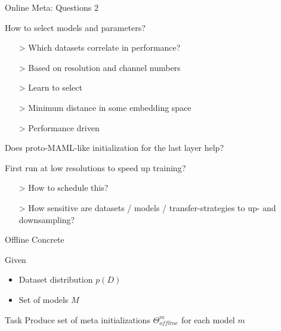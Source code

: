\documentclass[aspectratio=169,12pt,handout]{beamer}
\begin{document}
\begin{frame}{Online Meta: Questions 2}


\begin{itemizebig}
    \item How to select models and parameters?
    \begin{itemize}
        \item[>] Which datasets correlate in performance?
        \item[>] Based on resolution and channel numbers
        \item[>] Learn to select
        \item[>] Minimum distance in some embedding space
        \item[>] Performance driven
    \end{itemize}

    \item Does proto-MAML-like initialization for the last layer help?

    \item First run at low resolutions to speed up training?
    \begin{itemize}
        \item[>] How to schedule this?
        \item[>] How sensitive are datasets / models / transfer-strategies to up- and downsampling?
    \end{itemize}

\end{itemizebig}

\end{frame}



\begin{frame}{Offline Concrete}

\begin{block}{Given}
  \begin{itemize}
      \item Dataset distribution $p(D)$
      \item Set of models $M$
  \end{itemize}
\end{block}

\begin{block}{Task}
Produce set of meta initializations $\Theta_{offline}^m$ for each model $m$
\end{block}

\end{frame}
\end{document}
